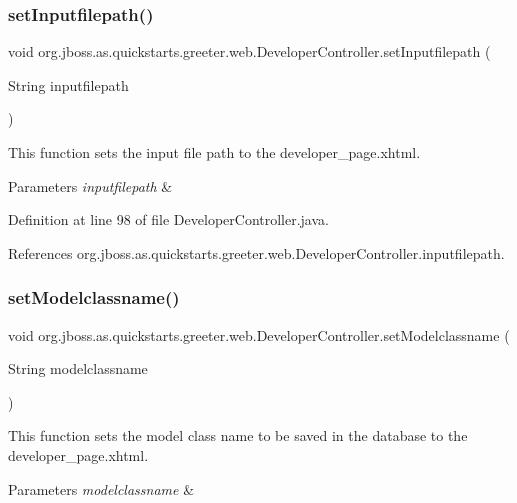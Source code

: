 \subsubsection{\texorpdfstring{set\+Inputfilepath()}{setInputfilepath()}}
{\footnotesize\ttfamily void org.\+jboss.\+as.\+quickstarts.\+greeter.\+web.\+Developer\+Controller.\+set\+Inputfilepath (\begin{DoxyParamCaption}\item[{String}]{inputfilepath }\end{DoxyParamCaption})}

This function sets the input file path to the developer\+\_\+page.\+xhtml. 
\begin{DoxyParams}{Parameters}
{\em inputfilepath} & \\
\hline
\end{DoxyParams}


Definition at line 98 of file Developer\+Controller.\+java.



References org.\+jboss.\+as.\+quickstarts.\+greeter.\+web.\+Developer\+Controller.\+inputfilepath.

\mbox{\label{classorg_1_1jboss_1_1as_1_1quickstarts_1_1greeter_1_1web_1_1_developer_controller_a787145ce2fa2297e874b5e3eba63cb6d}} 
\subsubsection{\texorpdfstring{set\+Modelclassname()}{setModelclassname()}}
{\footnotesize\ttfamily void org.\+jboss.\+as.\+quickstarts.\+greeter.\+web.\+Developer\+Controller.\+set\+Modelclassname (\begin{DoxyParamCaption}\item[{String}]{modelclassname }\end{DoxyParamCaption})}

This function sets the model class name to be saved in the database to the developer\+\_\+page.\+xhtml. 
\begin{DoxyParams}{Parameters}
{\em modelclassname} & \\
\hline
\end{DoxyParams}


